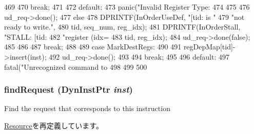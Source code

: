 \begin{DoxyCode}
{{{{{{469                     }
470                     break;
471 
472                   default:
473                     panic("Invalid Register Type: %
474                 }
475 
476                 ud_req->done();
477             } else {
478                 DPRINTF(InOrderUseDef, "[tid:%
       is "
479                         "not ready to write.\n",
480                         tid, seq_num, reg_idx);
481                 DPRINTF(InOrderStall, "STALL: [tid:%
482                         "register (idx=%
483                         tid, reg_idx);
484                 ud_req->done(false);
485             }
486         }
487         break;
488 
489       case MarkDestRegs:
490         {
491             regDepMap[tid]->insert(inst);
492             ud_req->done();
493         }
494         break;
495 
496       default:
497         fatal("Unrecognized command to %
498     }
499 
500 }
\end{DoxyCode}
\hypertarget{classUseDefUnit_ae3afc1c63d17a49a6301bd18fca574a0}{
\subsubsection[{findRequest}]{ findRequest ({\bf DynInstPtr} {\em inst})}}
\label{classUseDefUnit_ae3afc1c63d17a49a6301bd18fca574a0}
Find the request that corresponds to this instruction 

\hyperlink{classResource_ae3afc1c63d17a49a6301bd18fca574a0}{Resource}を再定義しています。



